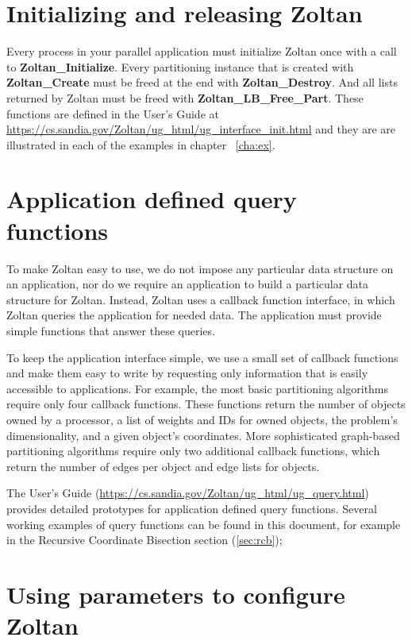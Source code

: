 \section{Initializing and releasing Zoltan}

Every process in your parallel application must initialize Zoltan once
with a call to \textbf{Zoltan\_Initialize}.  Every
partitioning instance that is created with \textbf{Zoltan\_Create} must be freed at
the end with \textbf{Zoltan\_Destroy}.  And all lists returned by
Zoltan must be freed with \textbf{Zoltan\_LB\_Free\_Part}.  These functions
are defined in the User's Guide at
\url{https://cs.sandia.gov/Zoltan/ug\_html/ug\_interface\_init.html}
and they are are illustrated in each of the examples in chapter ~\ref{cha:ex}.

\section{Application defined query functions}

To make Zoltan easy to use, we do not impose any particular data structure 
on an application, nor do we require an application to build a particular 
data structure for Zoltan. Instead, Zoltan uses a callback function interface, 
in which Zoltan queries the application for needed data. The application must 
provide simple functions that answer these queries.

To keep the application interface simple, we use a small set of callback functions 
and make them easy to write by requesting only information that is easily accessible 
to applications. For example, the most basic partitioning algorithms require only 
four callback functions. These functions return the number of objects owned by a 
processor, a list of weights and IDs for owned objects, the problem's dimensionality, 
and a given object's coordinates. More sophisticated graph-based partitioning 
algorithms require only two additional callback functions, which return the number 
of edges per object and edge lists for objects.

The User's Guide 
(\url{https://cs.sandia.gov/Zoltan/ug\_html/ug\_query.html})
provides detailed prototypes for application defined query functions.
Several working examples of query functions can be found in this document,
for example in the Recursive Coordinate Bisection section (\ref{sec:rcb});

\section{Using parameters to configure Zoltan}


